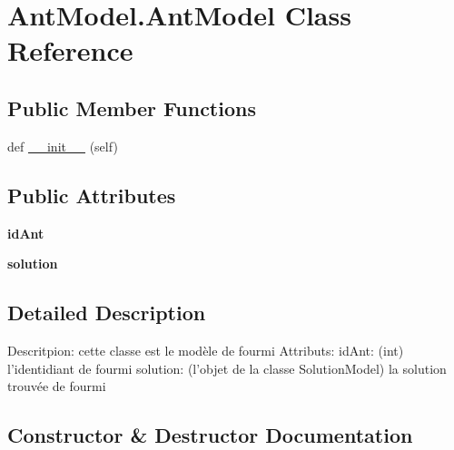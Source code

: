\hypertarget{class_ant_model_1_1_ant_model}{}\section{Ant\+Model.\+Ant\+Model Class Reference}
\label{class_ant_model_1_1_ant_model}
\subsection*{Public Member Functions}
\begin{DoxyCompactItemize}
\item 
def \mbox{\hyperlink{class_ant_model_1_1_ant_model_a9a1ace1d22157992755d89201d5f6156}{\+\_\+\+\_\+init\+\_\+\+\_\+}} (self)
\end{DoxyCompactItemize}
\subsection*{Public Attributes}
\begin{DoxyCompactItemize}
\item 
\mbox{\label{class_ant_model_1_1_ant_model_afc65b0d0f167bc2bbff2f89c675d664f}} 
{\bfseries id\+Ant}
\item 
\mbox{\label{class_ant_model_1_1_ant_model_aa4fef511d4ddd9ae5d952881b6e72450}} 
{\bfseries solution}
\end{DoxyCompactItemize}


\subsection{Detailed Description}
\begin{DoxyVerb}Descritpion: cette classe est le modèle de fourmi
Attributs:
    idAnt: (int) l'identidiant de fourmi
    solution: (l'objet de la classe SolutionModel) la solution trouvée de fourmi
\end{DoxyVerb}
 

\subsection{Constructor \& Destructor Documentation}
\mbox{\label{class_ant_model_1_1_ant_model_a9a1ace1d22157992755d89201d5f6156}} 
